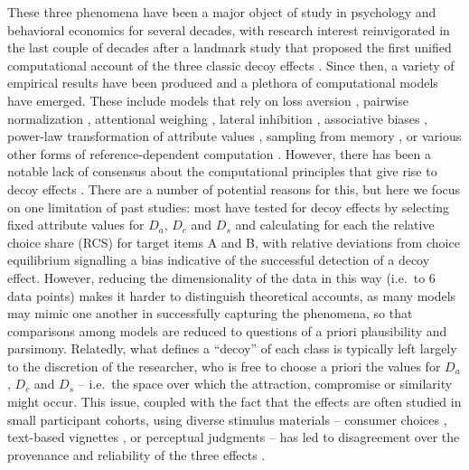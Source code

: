 \documentclass[a4paper, nobind]{templates/ociamthesis}
\begin{document}
These three phenomena have been a major object of study in psychology and behavioral economics for several decades, with research interest reinvigorated in the last couple of decades after a landmark study that proposed the first unified computational account of the three classic decoy effects \autocite{roe2001}. Since then, a variety of empirical results have been produced and a plethora of computational models have emerged. These include models that rely on loss aversion \autocite{tsetsos2010}, pairwise normalization \autocite{landry2021}, attentional weighing \autocite{hotaling2010,tsetsos2012,bhatia2013,trueblood2014}, lateral inhibition \autocite{hotaling2010}, associative biases \autocite{bhatia2013}, power-law transformation of attribute values \autocite{bhatia2013}, sampling from memory \autocite{noguchi2014,bhui2018}, or various other forms of reference-dependent computation \autocite{soltani2012,li2018,natenzon2019,rigoli2019}. However, there has been a notable lack of consensus about the computational principles that give rise to decoy effects \autocite{turner2018}. There are a number of potential reasons for this, but here we focus on one limitation of past studies: most have tested for decoy effects by selecting fixed attribute values for \(D_a\), \(D_c\) and \(D_s\) and calculating for each the relative choice share (RCS) for target items A and B, with relative deviations from choice equilibrium signalling a bias indicative of the successful detection of a decoy effect. However, reducing the dimensionality of the data in this way (i.e.~to 6 data points) makes it harder to distinguish theoretical accounts, as many models may mimic one another in successfully capturing the phenomena, so that comparisons among models are reduced to questions of a priori plausibility and parsimony. Relatedly, what defines a ``decoy'' of each class is typically left largely to the discretion of the researcher, who is free to choose a priori the values for \(D_a\), \(D_c\) and \(D_s\) -- i.e.~the space over which the attraction, compromise or similarity might occur. This issue, coupled with the fact that the effects are often studied in small participant cohorts, using diverse stimulus materials -- consumer choices \autocite{josiam1995}, text-based vignettes \autocite{yang2014}, or perceptual judgments \autocite{trueblood2013} -- has led to disagreement over the provenance and reliability of the three effects \autocite{trueblood2012,frederick2014,yang2014,trueblood2015}.
\end{document}
